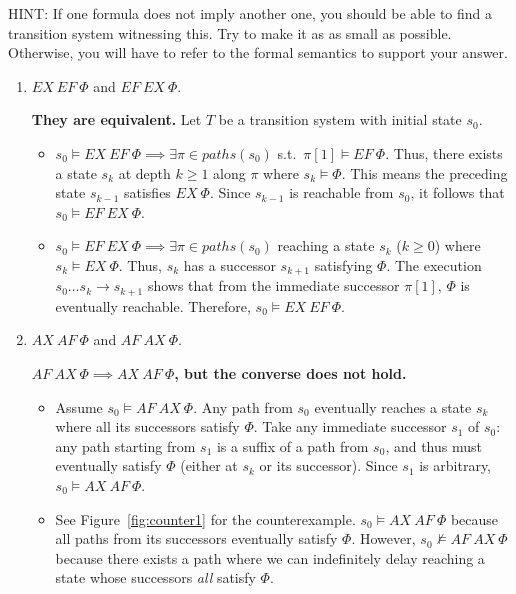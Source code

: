 \documentclass[12pt,a4paper]{article}
\begin{document}
\begin{description}
HINT: If one formula does not imply another one, you should be able to find a transition system witnessing this. Try to make it as as small as possible. Otherwise, you will have to refer to the formal semantics to support your answer. 

\begin{enumerate}[label=\alph*)]
\item $EX\ EF\ \Phi$ and $EF\ EX\ \Phi$.
%
\ifwithanswers
\color{blue}
\par\textbf{They are equivalent.} Let $T$ be a transition system with initial state $s_0$.
\begin{itemize}
    \item[$(\Rightarrow)$] $s_0 \models EX\ EF\ \Phi \implies \exists \pi \in paths(s_0)$ s.t.\ $\pi[1] \models EF\ \Phi$. Thus, there exists a state $s_k$ at depth $k \ge 1$ along $\pi$ where $s_k \models \Phi$. This means the preceding state $s_{k-1}$ satisfies $EX\ \Phi$. Since $s_{k-1}$ is reachable from $s_0$, it follows that $s_0 \models EF\ EX\ \Phi$.
    \item[$(\Leftarrow)$] $s_0 \models EF\ EX\ \Phi \implies \exists \pi \in paths(s_0)$ reaching a state $s_k$ ($k \ge 0$) where $s_k \models EX\ \Phi$. Thus, $s_k$ has a successor $s_{k+1}$ satisfying $\Phi$. The execution $s_0 \dots s_k \to s_{k+1}$ shows that from the immediate successor $\pi[1]$, $\Phi$ is eventually reachable. Therefore, $s_0 \models EX\ EF\ \Phi$.
\end{itemize}
\color{black}
\fi
%
\item $AX\ AF\ \Phi$ and $AF\ AX\ \Phi$.
%
\ifwithanswers
\color{blue}
\par\textbf{$AF\ AX\ \Phi \implies AX\ AF\ \Phi$, but the converse does not hold.}
\begin{itemize}
    \item[$(\Rightarrow)$] Assume $s_0 \models AF\ AX\ \Phi$. Any path from $s_0$ eventually reaches a state $s_k$ where all its successors satisfy $\Phi$. Take any immediate successor $s_1$ of $s_0$: any path starting from $s_1$ is a suffix of a path from $s_0$, and thus must eventually satisfy $\Phi$ (either at $s_k$ or its successor). Since $s_1$ is arbitrary, $s_0 \models AX\ AF\ \Phi$.
    \item[$(\not\Leftarrow)$] See Figure~\ref{fig:counter1} for the counterexample. $s_0 \models AX\ AF\ \Phi$ because all paths from its successors eventually satisfy $\Phi$. However, $s_0 \not\models AF\ AX\ \Phi$ because there exists a path where we can indefinitely delay reaching a state whose successors \emph{all} satisfy $\Phi$.

\end{itemize}
\end{enumerate}
\end{description}
\end{document}
